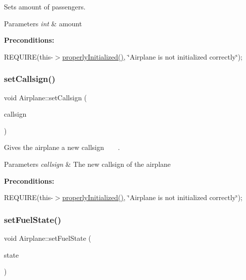 Sets amount of passengers. 


\begin{DoxyParams}{Parameters}
{\em int} & amount\\
\hline
\end{DoxyParams}
{\bfseries Preconditions\+:}
\begin{DoxyItemize}
\item R\+E\+Q\+U\+I\+RE(this-\/$>$\mbox{\hyperlink{class_airplane_a6f80df8f692cc8d67d292c1e9f26d59e}{properly\+Initialized()}}, \char`\"{}\+Airplane is not initialized correctly\char`\"{}); 
\end{DoxyItemize}\mbox{\label{class_airplane_aed67dce16e3a4b1c1811e3344a039d90}} 
\subsubsection{\texorpdfstring{set\+Callsign()}{setCallsign()}}
{\footnotesize\ttfamily void Airplane\+::set\+Callsign (\begin{DoxyParamCaption}\item[{const string \&}]{callsign }\end{DoxyParamCaption})}



Gives the airplane a new callsign ~\newline
 ~\newline
. 


\begin{DoxyParams}{Parameters}
{\em callsign} & The new callsign of the airplane\\
\hline
\end{DoxyParams}
{\bfseries Preconditions\+:}
\begin{DoxyItemize}
\item R\+E\+Q\+U\+I\+RE(this-\/$>$\mbox{\hyperlink{class_airplane_a6f80df8f692cc8d67d292c1e9f26d59e}{properly\+Initialized()}}, \char`\"{}\+Airplane is not initialized correctly\char`\"{}); 
\end{DoxyItemize}\mbox{\label{class_airplane_a29757f797880dacd6505bf072291740d}} 
\subsubsection{\texorpdfstring{set\+Fuel\+State()}{setFuelState()}}
{\footnotesize\ttfamily void Airplane\+::set\+Fuel\+State (\begin{DoxyParamCaption}\item[{const \mbox{\hyperlink{class_airplane_ad17ce69f4dd39704789158c726f5bf45}{Fuel\+State}}}]{state }\end{DoxyParamCaption})}




